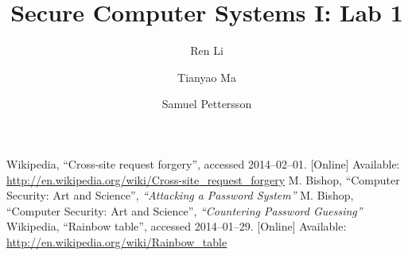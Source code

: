 \documentclass{article}
\title{\textbf{Secure Computer Systems I: Lab 1}}
\author{Ren Li \and Tianyao Ma \and Samuel Pettersson}
\begin{document}
\maketitle



\begin{thebibliography}{9}
  Wikipedia,
  ``Cross-site request forgery'',
  accessed 2014--02--01.
  [Online]
  Available: \url{http://en.wikipedia.org/wiki/Cross-site_request_forgery}
  M. Bishop,
  ``Computer Security: Art and Science'',
  \textit{``Attacking a Password System''}
  M. Bishop,
  ``Computer Security: Art and Science'',
  \textit{``Countering Password Guessing''}
  Wikipedia,
  ``Rainbow table'',
  accessed 2014--01--29.
  [Online]
  Available: \url{http://en.wikipedia.org/wiki/Rainbow_table}
\end{thebibliography}
\end{document}
